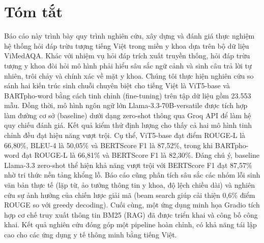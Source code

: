 \chapter*{Tóm tắt}
Báo cáo này trình bày quy trình nghiên cứu, xây dựng và đánh giá thực nghiệm hệ thống hỏi đáp trừu tượng tiếng Việt trong miền y khoa dựa trên bộ dữ liệu ViMedAQA. Khác với nhiệm vụ hỏi đáp trích xuất truyền thống, hỏi đáp trừu tượng y khoa đòi hỏi mô hình phải hiểu sâu sắc ngữ cảnh và sinh câu trả lời tự nhiên, trôi chảy và chính xác về mặt y khoa. Chúng tôi thực hiện nghiên cứu so sánh hai kiến trúc sinh chuỗi chuyên biệt cho tiếng Việt là ViT5-base và BARTpho-word bằng cách tinh chỉnh (fine-tuning) trên tập dữ liệu gồm 23.553 mẫu. Đồng thời, mô hình ngôn ngữ lớn Llama-3.3-70B-versatile được tích hợp làm đường cơ sở (baseline) dưới dạng zero-shot thông qua Groq API để làm hệ quy chiếu đánh giá. Kết quả kiểm thử định lượng cho thấy cả hai mô hình tinh chỉnh đều đạt hiệu năng vượt trội. Cụ thể, ViT5-base đạt điểm ROUGE-L là 66,80\%, BLEU-4 là 50,05\% và BERTScore F1 là 87,52\%, trong khi BARTpho-word đạt ROUGE-L là 66,81\% và BERTScore F1 là 82,30\%. Đáng chú ý, baseline Llama-3.3 zero-shot thể hiện khả năng vượt trội với BERTScore F1 đạt 87,57\% nhờ tri thức nền tảng khổng lồ. Báo cáo cũng phân tích sâu sắc các nhóm lỗi sinh văn bản thực tế (lặp từ, ảo tưởng thông tin y khoa, độ lệch chiều dài) và nghiên cứu sự ảnh hưởng của chiến lược giải mã (beam search giúp cải thiện 0,6\% điểm ROUGE so với greedy decoding). Cuối cùng, một ứng dụng minh họa Gradio tích hợp cơ chế truy xuất thông tin BM25 (RAG) đã được triển khai và công bố công khai. Kết quả nghiên cứu đóng góp một pipeline hoàn chỉnh, có khả năng tái lập cao cho các ứng dụng y tế thông minh bằng tiếng Việt.
\clearpage